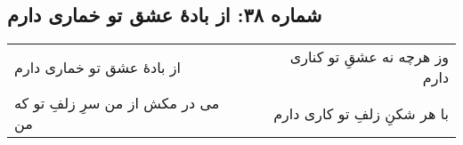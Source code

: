 \begin{center}
\section*{شماره ۳۸: از بادۀ عشق تو خماری دارم}
\label{sec:038}
\begin{longtable}{l p{0.5cm} r}
از بادهٔ عشق تو خماری دارم
&&
وز هرچه نه عشقِ تو کناری دارم
\\
می در مکش از من سرِ زلفِ تو که من
&&
با هر شکنِ زلفِ تو کاری دارم
\\
\end{longtable}
\end{center}
